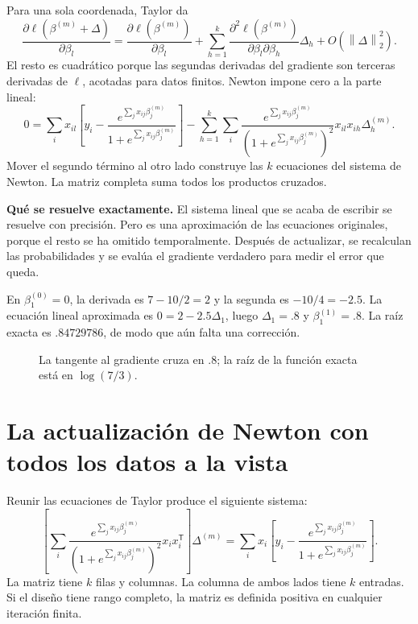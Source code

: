 \documentclass[11pt,a4paper]{article}
\newcommand{\T}{^{\mathsf T}}
\newcommand{\norm}[1]{\left\lVert #1\right\rVert}
\begin{document}
Para una sola coordenada, Taylor da
\[
\frac{\partial\ell(\beta^{(m)}+\Delta)}{\partial\beta_l}
=\frac{\partial\ell(\beta^{(m)})}{\partial\beta_l}
+\sum_{h=1}^k
\frac{\partial^2\ell(\beta^{(m)})}{\partial\beta_l\partial\beta_h}
\Delta_h+O(\norm\Delta_2^2).
\]
El resto es cuadrático porque las segundas derivadas del gradiente
son terceras derivadas de $\ell$, acotadas para datos finitos.
Newton impone cero a la parte lineal:
\[
0=\sum_i x_{il}\left[
y_i-\frac{e^{\sum_jx_{ij}\beta_j^{(m)}}}{1+e^{\sum_jx_{ij}\beta_j^{(m)}}}
\right]
-\sum_{h=1}^k\sum_i
\frac{e^{\sum_jx_{ij}\beta_j^{(m)}}}
{(1+e^{\sum_jx_{ij}\beta_j^{(m)}})^2}
x_{il}x_{ih}\Delta_h^{(m)}.
\]
Mover el segundo término al otro lado construye las $k$ ecuaciones
del sistema de Newton.
La matriz completa suma todos los productos cruzados.

\textbf{Qué se resuelve exactamente.}
El sistema lineal que se acaba de escribir se resuelve con precisión.
Pero es una aproximación de las ecuaciones originales,
porque el resto se ha omitido temporalmente.
Después de actualizar, se recalculan las probabilidades y se
evalúa el gradiente verdadero para medir el error que queda.

\begin{ejemplo}
En $\beta_1^{(0)}=0$, la derivada es $7-10/2=2$
y la segunda es $-10/4=-2.5$.
La ecuación lineal aproximada es $0=2-2.5\Delta_1$,
luego $\Delta_1=.8$ y $\beta_1^{(1)}=.8$.
La raíz exacta es $.84729786$, de modo que aún falta una corrección.
\end{ejemplo}

\begin{figure}[H]\centering
{}
\caption{La tangente al gradiente cruza en $.8$; la raíz de la función exacta está en $\log(7/3)$.}
\end{figure}

\clearpage
\section{La actualización de Newton con todos los datos a la vista}\label{logit41}
Reunir las ecuaciones de Taylor produce el siguiente sistema:
\[
\left[
\sum_i\frac{e^{\sum_jx_{ij}\beta_j^{(m)}}}
{(1+e^{\sum_jx_{ij}\beta_j^{(m)}})^2}x_ix_i\T
\right]\Delta^{(m)}
=
\sum_i x_i\left[
y_i-\frac{e^{\sum_jx_{ij}\beta_j^{(m)}}}
{1+e^{\sum_jx_{ij}\beta_j^{(m)}}}\right].
\]
La matriz tiene $k$ filas y columnas. La columna de ambos lados
tiene $k$ entradas. Si el diseño tiene rango completo,
la matriz es definida positiva en cualquier iteración finita.
\end{document}
